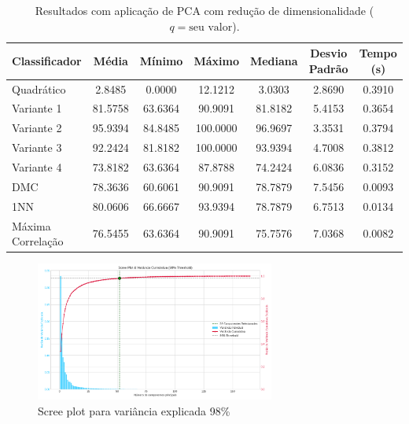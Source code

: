 \documentclass[a4paper, 12pt]{article}
\begin{document}
\begin{table}[H]
    \centering
    \caption{Resultados com aplicação de PCA com redução de dimensionalidade ($q = \text{seu valor}$).}
    \label{tab:pca_com_reducao}
    \begin{tabular}{lcccccc}
        \toprule
        \textbf{Classificador} & \textbf{Média} & \textbf{Mínimo} & \textbf{Máximo} & \textbf{Mediana} & \textbf{Desvio Padrão} & \textbf{Tempo (s)} \\
        \midrule
        Quadrático         & 2.8485   & 0.0000   & 12.1212   & 3.0303   & 2.8690         & 0.3910\\
        Variante 1         & 81.5758  & 63.6364  & 90.9091   & 81.8182  & 5.4153         & 0.3654\\
        Variante 2         & 95.9394  & 84.8485  & 100.0000  & 96.9697  & 3.3531         & 0.3794\\
        Variante 3         & 92.2424  & 81.8182  & 100.0000  & 93.9394  & 4.7008         & 0.3812\\
        Variante 4         & 73.8182  & 63.6364  & 87.8788   & 74.2424  & 6.0836         & 0.3152\\
        DMC                & 78.3636  & 60.6061  & 90.9091   & 78.7879  & 7.5456         & 0.0093\\
        1NN                & 80.0606  & 66.6667  & 93.9394   & 78.7879  & 6.7513         & 0.0134\\
        Máxima Correlação  & 76.5455  & 63.6364  & 90.9091   & 75.7576  & 7.0368         & 0.0082\\
        \bottomrule
    \end{tabular}
\end{table}

\begin{figure}
    \centering
    \includegraphics[width=0.7\textwidth]{./recfaces_30_pca_98_scree_plot.png}
    \caption{Scree plot para variância explicada 98\%}
\end{figure}
\end{document}
